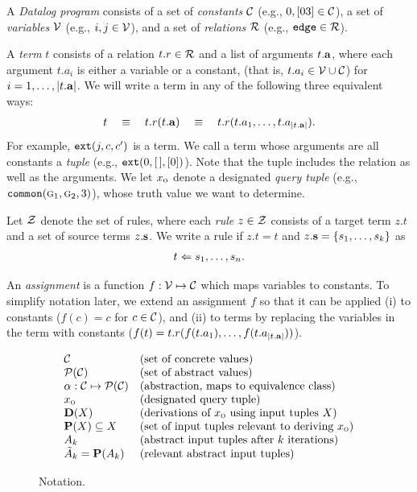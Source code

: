 
A {\em Datalog program} consists of
a set of {\em constants} $\mathcal{C}$ (e.g., $0,[03] \in \mathcal{C}$),
a set of {\em variables} $\mathcal{V}$ (e.g., $i, j \in \mathcal{V}$), and
a set of {\em relations} $\mathcal{R}$ (e.g., $\text{\tt edge} \in \mathcal{R}$).

A {\em term} $t$ consists of a relation $t.r \in \mathcal{R}$ and a list of arguments $t.\mathbf{a}$,
where each argument $t.a_i$ is either a variable or a constant,
(that is, $t.a_i \in \mathcal{V} \cup \mathcal{C}$) for $i = 1, \dots, |t.\mathbf{a}|$.
We will write a term in any of the following three equivalent ways:
\begin{align}
t \quad\equiv\quad t.r(t.\mathbf{a}) \quad\equiv\quad t.r(t.a_1, \dots, t.a_{|t.\mathbf{a}|}).
\end{align}
For example, $\text{\tt ext}(j,c,c')$ is a term.
We call a term whose arguments are all constants a {\em tuple}
(e.g., $\text{\tt ext}(0, [\,], [0])$).
Note that the tuple includes the relation as well as the arguments.
We let $x_\text{\sc o}$ denote a designated {\em query tuple} (e.g., $\text{\tt common}(\text{\sc g}_1,\text{\sc g}_2,3)$),
whose truth value we want to determine.

Let $\mathcal{Z}$ denote the set of rules,
where each {\em rule} $z \in \mathcal{Z}$ consists of a target term $z.t$ and a set of source terms $z.\mathbf{s}$.
We write a rule if $z.t = t$ and $z.\mathbf{s} = \{ s_1, \dots, s_k \}$ as
\begin{align}
t \Leftarrow s_1, \dots, s_n.
\end{align}

An {\em assignment} is a function $f : \mathcal{V} \mapsto \mathcal{C}$ which maps variables to
constants.  To simplify notation later, we extend an assignment $f$ so that it
can be applied (i) to constants ($f(c) = c$ for $c \in \mathcal{C}$), and (ii) to terms by
replacing the variables in the term with constants ($f(t) = t.r(f(t.a_1), \dots, f(t.a_{|t.\mathbf{a}|}))$).

\begin{figure}[t]
\[
\begin{array}{ll}
\mathcal{C}                           & \text{(set of concrete values)} \\
\mathcal{P}(\mathcal{C})                      & \text{(set of abstract values)} \\
\alpha : \mathcal{C} \mapsto \mathcal{P}(\mathcal{C}) & \text{(abstraction, maps to equivalence class)} \\
x_\text{\sc o}                           & \text{(designated query tuple)} \\
\mathbf{D}(X)                        & \text{(derivations of $x_\text{\sc o}$ using input tuples $X$)} \\
\mathbf{P}(X) \subseteq X            & \text{(set of input tuples relevant to deriving $x_\text{\sc o}$)} \\
A_k                           & \text{(abstract input tuples after $k$ iterations)} \\
\tilde A_k = \mathbf{P}(A_k)         & \text{(relevant abstract input tuples)} \\
\end{array}
\]
\caption{\label{fig:notation} Notation.}
\end{figure}

